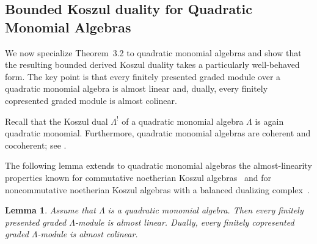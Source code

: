 \documentclass[11pt]{article}
\newtheorem{lemma}[theorem]{Lemma}
\theoremstyle{definition}
\theoremstyle{remark}
\begin{document}
\subsection{Bounded Koszul duality for Quadratic Monomial Algebras}
We now specialize Theorem~3.2 to quadratic monomial algebras and show that the resulting bounded derived Koszul duality takes a particularly well-behaved form. The key point is that every finitely presented graded module over a quadratic monomial algebra is almost linear and, dually, every finitely copresented graded module is almost colinear.

\medskip

Recall that the Koszul dual \(\Lambda^{!}\) of a quadratic monomial algebra
\(\Lambda\) is again quadratic monomial. Furthermore, quadratic monomial
algebras are coherent and cocoherent; see \cite[Theorem~3.3]{10}.

\medskip 

The following lemma extends to quadratic monomial algebras the almost-linearity
properties known for commutative noetherian Koszul algebras~\cite{2} and for
noncommutative noetherian Koszul algebras with a balanced dualizing
complex~\cite{24}.

\begin{lemma}
Assume that \(\Lambda\) is a quadratic monomial algebra. Then every finitely
presented graded \(\Lambda\)-module is almost linear. Dually, every finitely
copresented graded \(\Lambda\)-module is almost colinear.
\end{lemma}
\end{document}
